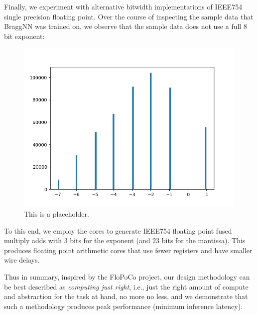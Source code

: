 Finally, we experiment with alternative bitwidth implementations of IEEE754 single precision floating point.
Over the course of inspecting the sample data that BraggNN was trained on, we observe that the sample data does not use a full 8 bit exponent:  
\begin{figure}
  \includegraphics[width=\columnwidth]{figures/exp_bits}
  \caption{This is a placeholder.}
\end{figure}
To this end, we employ the cores to generate IEEE754 floating point fused multiply adds with 3 bits for the exponent (and 23 bits for the mantissa).
This produces floating point arithmetic cores that use fewer registers and have smaller wire delays.

Thus in summary, inspired by the FloPoCo project, our design methodology can be best described as \emph{computing just right}, i.e., just the right amount of compute and abstraction for the task at hand, no more no less, and we demonstrate that such a methodology produces peak performance (minimum inference latency).